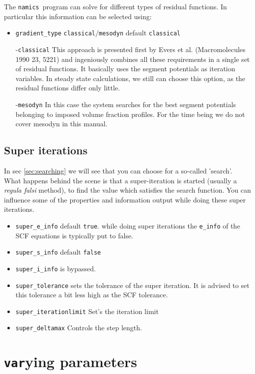 \documentclass{article}
\newcommand{\namics}{{\tt namics}}
\begin{document}
The \namics\ program can solve for different types of residual functions. In particular this information can be selected using:
\begin{itemize}
\item {\tt gradient\_type} {\tt classical}/{\tt mesodyn} default {\tt classical}

-{\tt classical} This approach is presented first by Evers et al. (Macromolecules 1990 23, 5221) and ingeniously combines all these requirements in a single set of residual functions. It basically uses the segment potentials as iteration variables. In steady state calculations, we still can choose this option, as the residual functions differ only little. %

-{\tt mesodyn} In this case the system searches for the best segment potentials belonging to imposed volume fraction profiles. For the time being we do not cover mesodyn in this manual.
\end{itemize}

\subsection{Super iterations}
In sec \ref{sec:searching} we will see that you can choose for a so-called 'search'. What happens behind the scene is that a super-iteration is started (usually a {\it regula falsi} method), to find the value which satisfies the search function. You can influence some of the properties and information output while doing these super iterations. 

\begin{itemize}
\item {\tt super\_e\_info} default {\tt true}. while doing super iterations the {\tt e\_info} of the SCF equations is typically put to false.
\item {\tt super\_s\_info} default {\tt false}
\item {\tt super\_i\_info} is bypassed. 
\item {\tt super\_tolerance} sets the tolerance of the super iteration. It is advised to set this tolerance a bit less high as the SCF tolerance. 
\item {\tt super\_iterationlimit} Set's the iteration limit
\item {\tt super\_deltamax} Controls the step length. 
\end{itemize}


\section{{\tt var}ying parameters}
\label{sec:varying}
\end{document}
